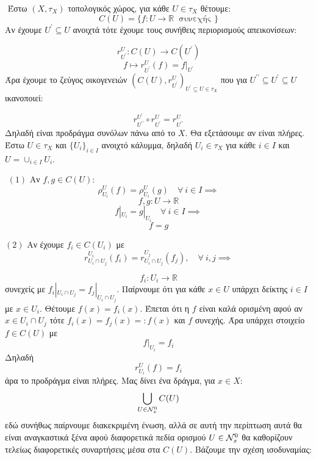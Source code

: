 \vspace*{0.3cm}

$ $\newline
Έστω $(X,\tau_X)$ τοπολογικός χώρος, για κάθε $U \in \tau_X$ θέτουμε:
$$C(U) = \{f:U\longrightarrow \mathbb{R}  \ \text{ συνεχής }\}$$ Αν έχουμε $U^{\prime} \subseteq U$ ανοιχτά τότε έχουμε τους συνήθεις περιορισμούς απεικονίσεων:

$$r^U_{U^{\prime}}:C(U)\longrightarrow C(U^{\prime})$$
$$f \longmapsto r^U_{U^{\prime}} (f) = f|_{U^{\prime}}$$ Άρα έχουμε το ζεύγος οικογενειών $(C(U),r^U_{U^{\prime}})_{U^{\prime} \subseteq U \in \tau_X}$ που για $U^{\prime\prime} \subseteq U^{\prime} \subseteq U$  ικανοποιεί:

\begin{figure}[H]
    \centering
\end{figure}
$$ r^{U^{\prime}}_{U^{\prime\prime}} \circ r^{U}_{U^{\prime}} =  r^{U}_{U^{\prime\prime}}$$ Δηλαδή είναι προδράγμα συνόλων πάνω από το $X$. Θα εξετάσουμε αν είναι πλήρες. Έστω $U \in \tau_X$ και $\{U_i\}_{i \in I}$ ανοιχτό κάλυμμα, δηλαδή $U_i \in \tau_X$ για κάθε $i \in I$ και $U = \cup_{i \in I} U_i$.

$ $\newline
$(1)$ Αν $f,g \in C(U):$
$$\rho^U_{U_i}(f) = \rho^U_{U_i}(g) \quad \forall \ i \in I \implies $$
$$f,g:U\longrightarrow \mathbb{R}$$
$$f|_{U_i} = g|_{U_i} \quad \forall \ i \in I \implies $$
$$f = g$$

\noindent $(2)$ Αν έχουμε $f_i \in C(U_i)$ με 
$$r^{U_i}_{U_i \cap U_j} (f_i) = r^{U_j}_{U_i \cap U_j} (f_j), \quad \forall \ i,j \implies $$

$$f_i:U_i \longrightarrow \mathbb{R}$$ συνεχείς με $f_i|_{U_i \cap U_j} = f_j|_{U_i\cap U_j}$. Παίρνουμε ότι για κάθε $x \in U$ υπάρχει δείκτης $i \in I$ με $x \in U_i$. Θέτουμε $f(x) = f_i(x)$. Έπεται ότι η $f$ είναι καλά ορισμένη αφού αν $x \in U_i \cap U_j$ τότε $f_i(x) = f_j(x) =:f(x)$ και $f$ συνεχής. Άρα υπάρχει στοιχείο $f \in C(U)$ με
$$f|_{U_i} = f_i$$ Δηλαδή
$$r^U_{U_i}(f) = f_i$$ άρα το προδράγμα είναι πλήρες. Μας δίνει ένα δράγμα, για $x \in X$:
$$\bigcup\limits_{U \in \mathcal{N}^0_x} C(U)$$ εδώ συνήθως παίρνουμε διακεκριμένη ένωση, αλλά σε αυτή την περίπτωση αυτά θα είναι αναγκαστικά ξένα αφού διαφορετικά πεδία ορισμού $U \in \mathcal{N}^0_x$ θα καθορίζουν τελείως διαφορετικές συναρτήσεις μέσα στα $C(U)$. Βάζουμε την σχέση ισοδυναμίας:

